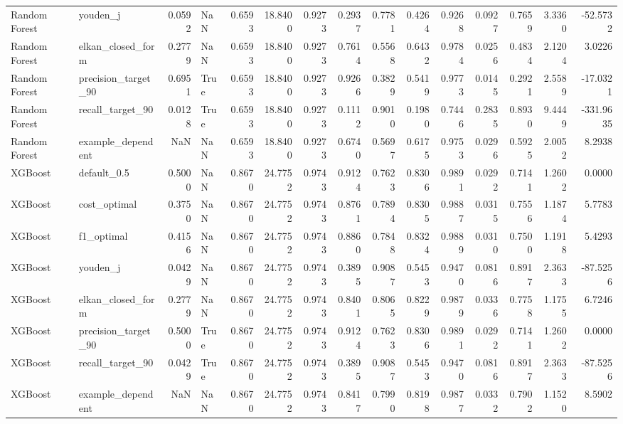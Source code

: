 \begin{table}
\begin{tabular}{llrlrrrrrrrrrrr}
Random Forest & youden\_j & 0.0592 & NaN & 0.6593 & 18.8400 & 0.9273 & 0.2937 & 0.7781 & 0.4264 & 0.9268 & 0.0927 & 0.7659 & 3.3360 & -52.5732 \\
Random Forest & elkan\_closed\_form & 0.2779 & NaN & 0.6593 & 18.8400 & 0.9273 & 0.7614 & 0.5568 & 0.6432 & 0.9784 & 0.0256 & 0.4834 & 2.1204 & 3.0226 \\
Random Forest & precision\_target\_90 & 0.6951 & True & 0.6593 & 18.8400 & 0.9273 & 0.9266 & 0.3829 & 0.5419 & 0.9773 & 0.0145 & 0.2921 & 2.5589 & -17.0321 \\
Random Forest & recall\_target\_90 & 0.0128 & True & 0.6593 & 18.8400 & 0.9273 & 0.1112 & 0.9010 & 0.1980 & 0.7446 & 0.2835 & 0.8930 & 9.4449 & -331.9635 \\
Random Forest & example\_dependent & NaN & NaN & 0.6593 & 18.8400 & 0.9273 & 0.6740 & 0.5697 & 0.6175 & 0.9753 & 0.0296 & 0.5925 & 2.0052 & 8.2938 \\
XGBoost & default\_0.5 & 0.5000 & NaN & 0.8670 & 24.7752 & 0.9743 & 0.9124 & 0.7623 & 0.8306 & 0.9891 & 0.0292 & 0.7141 & 1.2602 & 0.0000 \\
XGBoost & cost\_optimal & 0.3750 & NaN & 0.8670 & 24.7752 & 0.9743 & 0.8761 & 0.7894 & 0.8305 & 0.9887 & 0.0315 & 0.7556 & 1.1874 & 5.7783 \\
XGBoost & f1\_optimal & 0.4156 & NaN & 0.8670 & 24.7752 & 0.9743 & 0.8860 & 0.7848 & 0.8324 & 0.9889 & 0.0310 & 0.7500 & 1.1918 & 5.4293 \\
XGBoost & youden\_j & 0.0429 & NaN & 0.8670 & 24.7752 & 0.9743 & 0.3895 & 0.9087 & 0.5453 & 0.9470 & 0.0816 & 0.8917 & 2.3633 & -87.5256 \\
XGBoost & elkan\_closed\_form & 0.2779 & NaN & 0.8670 & 24.7752 & 0.9743 & 0.8401 & 0.8065 & 0.8229 & 0.9879 & 0.0336 & 0.7758 & 1.1755 & 6.7246 \\
XGBoost & precision\_target\_90 & 0.5000 & True & 0.8670 & 24.7752 & 0.9743 & 0.9124 & 0.7623 & 0.8306 & 0.9891 & 0.0292 & 0.7141 & 1.2602 & 0.0000 \\
XGBoost & recall\_target\_90 & 0.0429 & True & 0.8670 & 24.7752 & 0.9743 & 0.3895 & 0.9087 & 0.5453 & 0.9470 & 0.0816 & 0.8917 & 2.3633 & -87.5256 \\
XGBoost & example\_dependent & NaN & NaN & 0.8670 & 24.7752 & 0.9743 & 0.8417 & 0.7990 & 0.8198 & 0.9877 & 0.0332 & 0.7902 & 1.1520 & 8.5902 \\
\bottomrule
\end{tabular}
\end{table}
